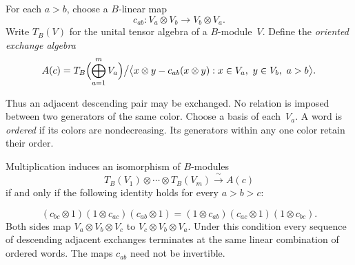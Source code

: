 For each $a>b$, choose a $B$-linear map
\[
 c_{ab}:V_a\otimes V_b\longrightarrow V_b\otimes V_a.
\]
Write $T_B(V)$ for the unital tensor algebra of a $B$-module~$V$.
Define the \emph{oriented exchange algebra}
\begin{equation}\label{cbc:exchange:algebra}
 A(c)=T_B\Bigl(\bigoplus_{a=1}^m V_a\Bigr)
       \big/\bigl\langle x\otimes y-c_{ab}(x\otimes y):
                         x\in V_a,\ y\in V_b,\ a>b\bigr\rangle.
\end{equation}

Thus an adjacent descending pair may be exchanged.  No relation is imposed
between two generators of the same color.  Choose a basis of each~$V_a$.
A word is \emph{ordered} if its colors are nondecreasing.  Its generators
within any one color retain their order.

\begin{theorem}\label{cbc:exchange:normal}
Multiplication induces an isomorphism of $B$-modules
\begin{equation}\label{cbc:exchange:ordered-module}
 T_B(V_1)\otimes\cdots\otimes T_B(V_m)\xrightarrow{\ \sim\ }A(c)
\end{equation}
if and only if the following identity holds for every $a>b>c$:

\begin{equation}\label{cbc:exchange:colored-braid}
 (c_{bc}\otimes1)(1\otimes c_{ac})(c_{ab}\otimes1)
 = (1\otimes c_{ab})(c_{ac}\otimes1)(1\otimes c_{bc}).
\end{equation}
Both sides map $V_a\otimes V_b\otimes V_c$ to $V_c\otimes V_b\otimes V_a$.
Under this condition every sequence of descending adjacent exchanges
terminates at the same linear combination of ordered words.
The maps $c_{ab}$ need not be invertible.
\end{theorem}
